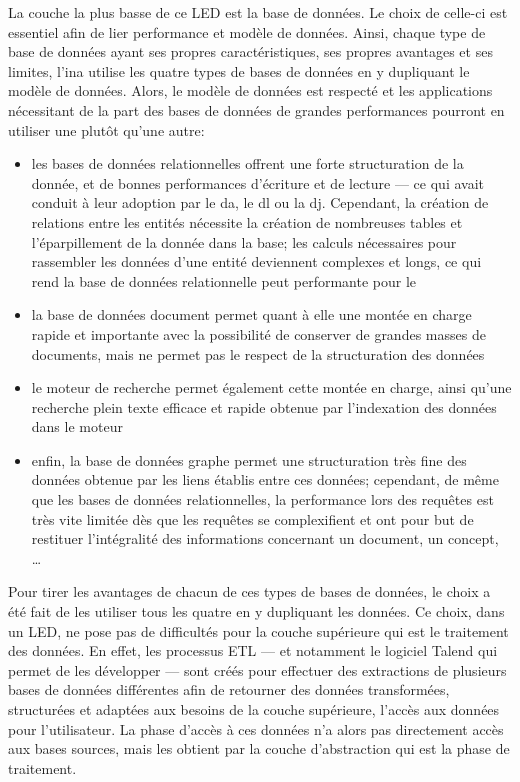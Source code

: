La couche la plus basse de ce LED est la base de données. Le choix de celle-ci est essentiel afin de lier performance et modèle de données. Ainsi, chaque type de base de données ayant ses propres caractéristiques, ses propres avantages et ses limites, l'\ac{ina} utilise les quatre types de bases de données en y dupliquant le modèle de données. Alors, le modèle de données est respecté et les applications nécessitant de la part des bases de données de grandes performances pourront en utiliser une plutôt qu'une autre:
\begin{itemize}
	\item les bases de données relationnelles offrent une forte structuration de la donnée, et de bonnes performances d'écriture et de lecture --- ce qui avait conduit à leur adoption par le \ac{da}, le \ac{dl} ou la \ac{dj}. Cependant, la création de relations entre les entités nécessite la création de nombreuses tables et l'éparpillement de la donnée dans la base; les calculs nécessaires pour rassembler les données d'une entité deviennent complexes et longs, ce qui rend la base de données relationnelle peut performante pour le \ldd
	\item la base de données document permet quant à elle une montée en charge rapide et importante avec la possibilité de conserver de grandes masses de documents, mais ne permet pas le respect de la structuration des données
	\item le moteur de recherche permet également cette montée en charge, ainsi qu'une recherche plein texte efficace et rapide obtenue par l'indexation des données dans le moteur
	\item enfin, la base de données graphe permet une structuration très fine des données obtenue par les liens établis entre ces données; cependant, de même que les bases de données relationnelles, la performance lors des requêtes est très vite limitée dès que les requêtes se complexifient et ont pour but de restituer l'intégralité des informations concernant un document, un concept, \dots
\end{itemize}
\medskip

Pour tirer les avantages de chacun de ces types de bases de données, le choix a été fait de les utiliser tous les quatre en y dupliquant les données. Ce choix, dans un LED, ne pose pas de difficultés pour la couche supérieure qui est le traitement des données. En effet, les processus ETL --- et notamment le logiciel Talend qui permet de les développer --- sont créés pour effectuer des extractions de plusieurs bases de données différentes afin de retourner des données transformées, structurées et adaptées aux besoins de la couche supérieure, l'accès aux données pour l'utilisateur. La phase d'accès à ces données n'a alors pas directement accès aux bases sources, mais les obtient par la couche d'abstraction qui est la phase de traitement.

